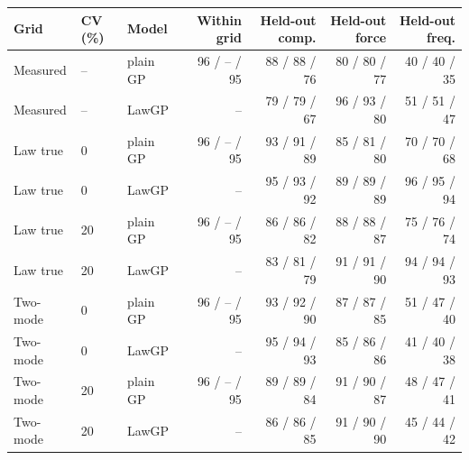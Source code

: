 \begin{tabular}{lllrrrr}
\toprule
Grid & CV (\%) & Model & Within grid & Held-out comp. & Held-out force & Held-out freq. \\
\midrule
Measured & -- & plain GP & 96 / -- / 95 & 88 / 88 / 76 & 80 / 80 / 77 & 40 / 40 / 35 \\
Measured & -- & LawGP & -- & 79 / 79 / 67 & 96 / 93 / 80 & 51 / 51 / 47 \\
\midrule
Law true & 0 & plain GP & 96 / -- / 95 & 93 / 91 / 89 & 85 / 81 / 80 & 70 / 70 / 68 \\
Law true & 0 & LawGP & -- & 95 / 93 / 92 & 89 / 89 / 89 & 96 / 95 / 94 \\
Law true & 20 & plain GP & 96 / -- / 95 & 86 / 86 / 82 & 88 / 88 / 87 & 75 / 76 / 74 \\
Law true & 20 & LawGP & -- & 83 / 81 / 79 & 91 / 91 / 90 & 94 / 94 / 93 \\
Two-mode & 0 & plain GP & 96 / -- / 95 & 93 / 92 / 90 & 87 / 87 / 85 & 51 / 47 / 40 \\
Two-mode & 0 & LawGP & -- & 95 / 94 / 93 & 85 / 86 / 86 & 41 / 40 / 38 \\
Two-mode & 20 & plain GP & 96 / -- / 95 & 89 / 89 / 84 & 91 / 90 / 87 & 48 / 47 / 41 \\
Two-mode & 20 & LawGP & -- & 86 / 86 / 85 & 91 / 90 / 90 & 45 / 44 / 42 \\
\bottomrule
\end{tabular}
